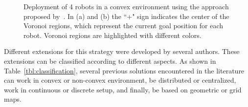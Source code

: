 \documentclass[smallcondensed]{svjour3}
\begin{document}
\begin{figure}[t]
\centering
{} 
\caption{Deployment of 4 robots in a convex environment using the approach proposed by~\cite{Cortes2004}. In (a) and (b) the ``+" sign indicates the center of the Voronoi regions, which represent the current goal position for each robot. Voronoi regions are highlighted with different colors.}
\label{fig:sampledeplyoment}
\end{figure}

Different extensions for this strategy were developed by several authors. These extensions can be classified according to different aspects.
As shown in Table~\ref{tbl:classification}, several previous solutions encountered in the literature can work in convex or non-convex environment, be distributed or centralized, work in continuous or discrete setup, and finally, be based on geometric or grid maps. 
\end{document}
